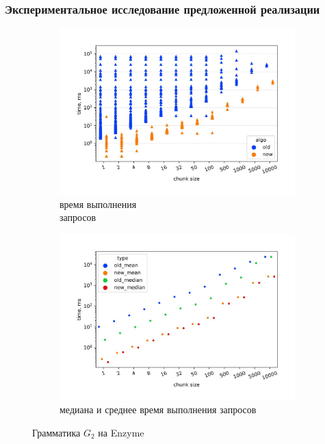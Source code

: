 \documentclass{beamer}
\begin{document}
\begin{frame}
\transwipe[direction=90]
 \frametitle{Экспериментальное исследование предложенной реализации}
     \begin{figure}[H]
    \begin{subfigure}[b]{0.5\textwidth}
    \centering
    \includegraphics[width=\textwidth]{pictures/subclass_old_new.pdf_1.jpg} \caption{время выполнения \\ запросов}
    \label{fig:subim1}
    \end{subfigure}%
    \begin{subfigure}[b]{0.5\textwidth}
    \centering
    \includegraphics[width=\columnwidth]{pictures/subclass_old_new_mean&median.pdf_1.jpg} \caption{медиана и среднее время выполнения запросов}
    \label{fig:subim2}
    \end{subfigure} \caption{Грамматика $G_2$ на Enzyme}
    \label{old_new2}
    \end{figure}
\end{frame}
\end{document}
